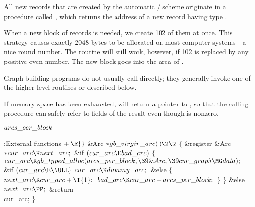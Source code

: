 All new  records that are created by the automatic /
scheme originate in a procedure called , which returns
the
address of a new record having type .

When a new block of  records is needed, we create 102 of them at
once.
This strategy causes exactly 2048 bytes to be allocated on most
computer systems---a nice round number. The routine will still work, however,
if 102 is replaced by any positive even number. The new block goes into
the  area of .

Graph-building programs do not usually call  directly;
they generally invoke one of the higher-level routines 
or  described below.

If memory space has been exhausted,  will return a
pointer to , so that the calling procedure can safely
refer to fields of the result even though  is
nonzero.

\Y\B\4\D$\\{arcs\_per\_block}$ \5
\par
\Y\B\4:External functions\X${}\mathrel+\E{}$\6
\1\1\&{Arc} ${}{*}\\{gb\_virgin\_arc}(\,)\2\2{}$\6
${}\{{}$\5
\1\&{register} \&{Arc} ${}{*}\\{cur\_arc}\K\\{next\_arc};{}$\7
\&{if} ${}(\\{cur\_arc}\E\\{bad\_arc}){}$\5
${}\{{}$\1\6
${}\\{cur\_arc}\K\\{gb\_typed\_alloc}(\\{arcs\_per\_block},\39\&{Arc},\39\\{cur%
\_graph}\MG\\{data});{}$\6
\&{if} ${}(\\{cur\_arc}\E\NULL){}$\1\5
${}\\{cur\_arc}\K\\{dummy\_arc};{}$\2\6
\&{else}\5
${}\{{}$\1\6
${}\\{next\_arc}\K\\{cur\_arc}+\T{1};{}$\6
${}\\{bad\_arc}\K\\{cur\_arc}+\\{arcs\_per\_block};{}$\6
\4${}\}{}$\2\6
\4${}\}{}$\2\6
\&{else}\1\5
${}\\{next\_arc}\PP;{}$\2\6
\&{return} \\{cur\_arc};\6
\4${}\}{}$\2\par
\fi

